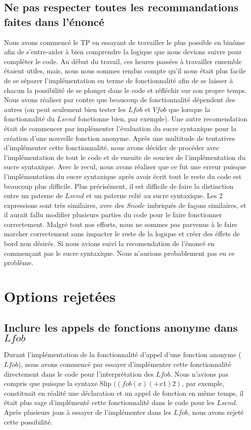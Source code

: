 \documentclass{article}
\begin{document}
	\subsection{Ne pas respecter toutes les recommandations faites dans l'énoncé}
	Nous avons commencé le TP en essayant de travailler le plus possible en binôme
	afin de s'entre-aider à bien comprendre la logique que nous devions suivre pour
	compléter le code. Au début du travail, ces heures passées à travailler ensemble
	étaient utiles, mais, nous nous sommes rendus compte qu'il nous était plus facile
	de se séparer l'implémentation en terme de fonctionnalité afin de se laisser à
	chacun la possibilité de se plonger dans le code et réfléchir sur son propre temps.
	Nous avons réaliser par contre que beaucoup de fonctionnalité dépendent des
	autres (on peut seulement bien tester les $Lfob$ et $Vfob$ que lorsque la fonctionnalité
	du $Lsend$ fonctionne bien, par exemple). Une autre recomendation était de
	commencer par implémenter l'évaluation du sucre syntaxique pour la création d'une
	nouvelle fonction anonyme. Après une multitude de tentatives d'implémenter cette
	fonctionnalité, nous avons décider de procéder avec l'implémentation de tout
	le code et de ensuite de soucier de l'implémentation du sucre syntaxique. Avec
	le recul, nous avons réaliser que ce fut une erreur puisque l'implémentation
	du sucre syntaxique après avoir écrit tout le reste du code est beaucoup plus
	difficile. Plus précisément, il est difficile de faire la distinction entre un
	paterne de $Lsend$ et un paterne relié au sucre syntaxique. Les 2 expressions sont
	très similaires, avec des $Snode$ imbriqués de façons similaires, et il aurait
	fallu modifier plusieurs parties du code pour le faire fonctionner correctement.
	Malgré tout nos efforts, nous ne sommes pas parvenus à le faire marcher correctement
	sans impacter le reste de la logique et créer des éffets de bord non désirés.
	Si nous avions suivi la recomendation de l'énoncé en commençant pas le sucre
	syntaxique. Nous n'aurions probablement pas eu ce problème.
	\section{Options rejetées}
	\subsection{Inclure les appels de fonctions anonyme dans $Lfob$}
	Durant l'implémentation de la fonctionnalité d'appel d'une fonction anonyme ($L
	fob$), nous avons commencé par essayer d'implémenter cette fonctionnalité directement
	dans le code pour l'interprétation des $Lfob$. Nous n'avions pas compris que
	puisque la syntaxe Slip $((fob (x)(+ x 1)2)$, par exemple, constituait en
	réalité une déclaration et un appel de fonction en même temps, il était plus sage
	d'implémenté cette fonctionnalité dans le code pour les $Lsend$. Après
	plusieurs jous à essayer de l'implémenter dans les $Lfob$, nous avons rejeté cette
	possibilité.
\end{document}
